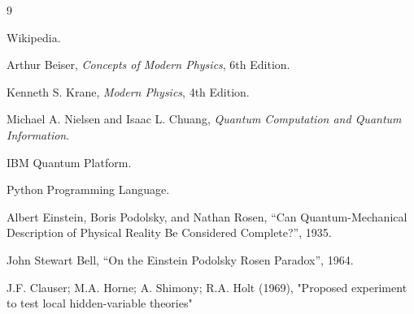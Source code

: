 \documentclass[14pt,a4paper]{extarticle}
\begin{document}
\begin{thebibliography}{9}

Wikipedia.

Arthur Beiser,
\textit{Concepts of Modern Physics},
6th Edition.

Kenneth S. Krane,
\textit{Modern Physics},
4th Edition.

Michael A. Nielsen and Isaac L. Chuang,
\textit{Quantum Computation and Quantum Information}.

IBM Quantum Platform.

Python Programming Language.

Albert Einstein, Boris Podolsky, and Nathan Rosen,
``Can Quantum-Mechanical Description of Physical Reality Be Considered Complete?'',
1935.

John Stewart Bell,
``On the Einstein Podolsky Rosen Paradox'',
1964.

J.F. Clauser; M.A. Horne; A. Shimony; R.A. Holt (1969), "Proposed experiment to test local hidden-variable theories"

\end{thebibliography}
\end{document}
